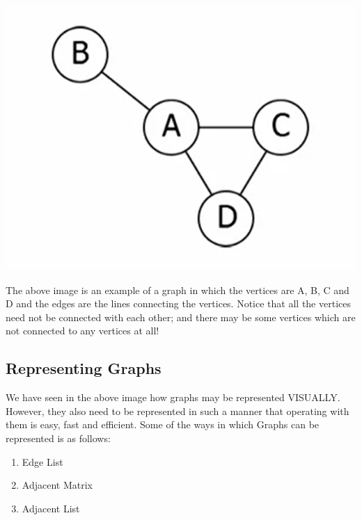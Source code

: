 \documentclass{article}
\theoremstyle{definition}
\theoremstyle{example}
\begin{document}
\begin{center}
    \includegraphics[scale = 0.8]{graph.png}
\end{center}

The above image is an example of a graph in which the vertices are A, B, C and D and the edges are the lines connecting the vertices. Notice that all the vertices need not be connected with each other; and there may be some vertices which are not connected to any vertices at all!\par

\subsection{\Large Representing Graphs}
\hspace{4mm} We have seen in the above image how graphs may be represented VISUALLY. However, they also need to be represented in such a manner that operating with them is easy, fast and efficient.
Some of the ways in which Graphs can be represented is as follows:

\begin{enumerate}
    \item Edge List
    \item Adjacent Matrix
    \item Adjacent List
\end{enumerate}
\end{document}
